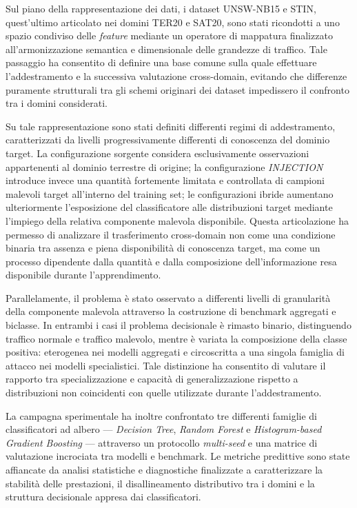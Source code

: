 Sul piano della rappresentazione dei dati, i dataset UNSW-NB15 e STIN, quest'ultimo articolato nei domini TER20 e SAT20, sono stati ricondotti a uno spazio condiviso delle \textit{feature} mediante un operatore di mappatura finalizzato all'armonizzazione semantica e dimensionale delle grandezze di traffico. 
Tale passaggio ha consentito di definire una base comune sulla quale effettuare l'addestramento e la successiva valutazione cross-domain, evitando che differenze puramente strutturali tra gli schemi originari dei dataset impedissero il confronto tra i domini considerati.

Su tale rappresentazione sono stati definiti differenti regimi di addestramento, caratterizzati da livelli progressivamente differenti di conoscenza del dominio target. 
La configurazione sorgente considera esclusivamente osservazioni appartenenti al dominio terrestre di origine; la configurazione \textit{INJECTION} introduce invece una quantità fortemente limitata e controllata di campioni malevoli target all'interno del training set; le configurazioni ibride aumentano ulteriormente l'esposizione del classificatore alle distribuzioni target mediante l'impiego della relativa componente malevola disponibile. 
Questa articolazione ha permesso di analizzare il trasferimento cross-domain non come una condizione binaria tra assenza e piena disponibilità di conoscenza target, ma come un processo dipendente dalla quantità e dalla composizione dell'informazione resa disponibile durante l'apprendimento.

Parallelamente, il problema è stato osservato a differenti livelli di granularità della componente malevola attraverso la costruzione di benchmark aggregati e biclasse. 
In entrambi i casi il problema decisionale è rimasto binario, distinguendo traffico normale e traffico malevolo, mentre è variata la composizione della classe positiva: eterogenea nei modelli aggregati e circoscritta a una singola famiglia di attacco nei modelli specialistici. 
Tale distinzione ha consentito di valutare il rapporto tra specializzazione e capacità di generalizzazione rispetto a distribuzioni non coincidenti con quelle utilizzate durante l'addestramento.

La campagna sperimentale ha inoltre confrontato tre differenti famiglie di classificatori ad albero --- \textit{Decision Tree}, \textit{Random Forest} e \textit{Histogram-based Gradient Boosting} --- attraverso un protocollo \textit{multi-seed} e una matrice di valutazione incrociata tra modelli e benchmark. 
Le metriche predittive sono state affiancate da analisi statistiche e diagnostiche finalizzate a caratterizzare la stabilità delle prestazioni, il disallineamento distributivo tra i domini e la struttura decisionale appresa dai classificatori.


